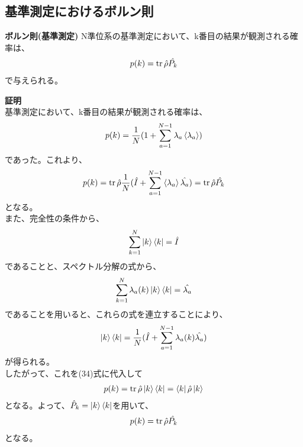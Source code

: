 \documentclass[a4paper,11pt]{jsarticle}
\begin{document}
\subsection{基準測定におけるボルン則}
\begin{itembox}[l]{\textbf{ボルン則(基準測定)}}
    N準位系の基準測定において、k番目の結果が観測される確率は、
    \begin{align}
        p(k) = \trace{\hat{\rho}\hat{P_k}}
    \end{align}
    で与えられる。
\end{itembox}
\textbf{証明}\\
基準測定において、k番目の結果が観測される確率は、
\begin{align}
    p(k) = \frac{1}{N}(1+\sum_{a=1}^{N-1}\lambda_a \ev{\lambda_a})
\end{align}
であった。これより、
\begin{align}
    p(k) = \trace{\hat{\rho}\frac{1}{N}(\hat I + \sum_{a=1}^{N-1}\ev{\lambda_a}\hat{\lambda_a})} = \trace{\hat{\rho}\hat{P_k}}
\end{align}
となる。\\
また、完全性の条件から、
\begin{align}
    \sum_{k=1}^{N} \ket{k}\bra{k} = \hat I
\end{align}
であることと、スペクトル分解の式から、
\begin{align}
    \sum_{k=1}^{N} \lambda_a(k) \ket{k}\bra{k} = \hat{\lambda_a}
\end{align}
であることを用いると、これらの式を連立することにより、
\begin{align}
    \ket{k}\bra{k} = \frac{1}{N}(\hat I + \sum_{a=1}^{N-1}\lambda_a(k)\hat{\lambda_a})
\end{align}
が得られる。\\
したがって、これを(34)式に代入して
\begin{align}
    p(k) =\trace{\hat{\rho}\ket{k}\bra{k}} = \bra{k}\hat{\rho}\ket{k}
\end{align}
となる。よって、$\hat{P}_k = \ket{k}\bra{k}$を用いて、
\begin{align}
    p(k) = \trace{\hat{\rho}\hat{P_k}}
\end{align}
となる。\\
\end{document}
